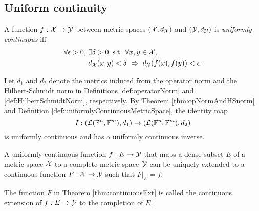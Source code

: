 \subsection{Uniform continuity}

\begin{defn}
  \label{def:uniformlyContinuousMetricSpace}
  A function $f: {\cal X} \rightarrow {\cal Y}$ between
  metric spaces $({\cal X},d_{\cal X})$ and $({\cal Y}, d_{\cal Y})$ 
  is \emph{uniformly continuous}
  iff
  \begin{align}
    \label{eq:uniformlyContinuousMetricSpace}
    \forall \epsilon>0,\
    & \exists \delta>0\, \text{ s.t. }
      \forall x,y \in {\cal X},\ \
    \\ \nonumber
    &d_{\cal X}(x,y)<\delta\ \Rightarrow\ d_{\cal Y}(f(x),f(y))<\epsilon.
  \end{align}
\end{defn}

\begin{exm}
  \label{exm:identityUniformlyCont}
  Let $d_1$ and $d_2$ denote the metrics
  induced from the operator norm and the Hilbert-Schmidt norm
  in Definitions \ref{def:operatorNorm} and
  \ref{def:HilbertSchmidtNorm}, respectively.
  By Theorem \ref{thm:opNormAndHSnorm}
  and Definition \ref{def:uniformlyContinuousMetricSpace}, 
  the identity map
  \begin{equation}
    \label{eq:identityUniformlyCont}
    I: \left({\cal L}(\mathbb{F}^n,\mathbb{F}^m), d_1\right)
    \rightarrow
    \left({\cal L}(\mathbb{F}^n,\mathbb{F}^m), d_2\right)
  \end{equation}
  is uniformly continuous and has a uniformly continuous inverse.
\end{exm}

\begin{thm}
  \label{thm:continuousExt}
  A uniformly continuous function $f: E \rightarrow {\cal Y}$ 
  that maps a dense subset $E$ of a metric space ${\cal X}$
  to a complete metric space ${\cal Y}$
  can be uniquely extended to a continuous function
  $F: {\cal X}\rightarrow {\cal Y}$ such that
  $F|_{E} = f$.
\end{thm}

\begin{defn}
  \label{def:continuousExt}
  The function $F$ in Theorem \ref{thm:continuousExt}
  is called the continuous extension of $f:E\rightarrow {\cal Y}$
  to the completion of $E$.
\end{defn}

